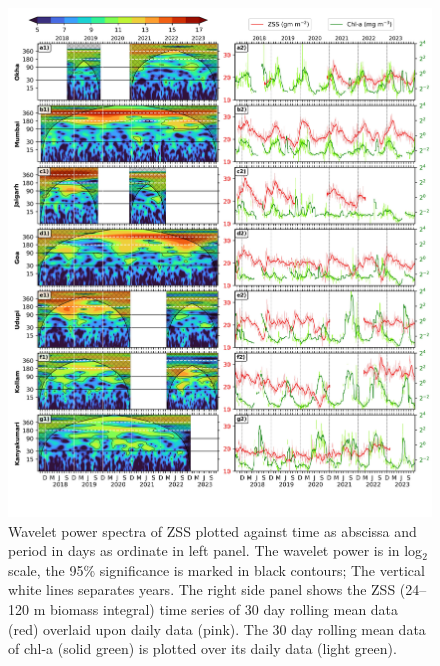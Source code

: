 \documentclass[authoryear,review,12pt]{elsarticle}
\begin{document}
\begin{figure}[htbp]
	\centering
	\includegraphics[width=\textwidth]{./figures/west_coast_wavelet_ss_scale.jpeg} 
	\captionsetup{justification=justified,font=footnotesize,skip=0.05\baselineskip,width=\textwidth}
	\caption{Wavelet power spectra of ZSS plotted against time as abscissa and period in days as ordinate in left panel. The wavelet power is in log$_2$ scale, the 95\% significance is marked in black contours; The vertical white lines separates years. The right side panel shows the ZSS (24--120 m biomass integral) time series of 30 day rolling mean data (red) overlaid upon daily data (pink). The 30 day rolling mean data of chl-a (solid green) is plotted over its daily data (light green).}
	\label{fig:wavess}
\end{figure}
\end{document}
